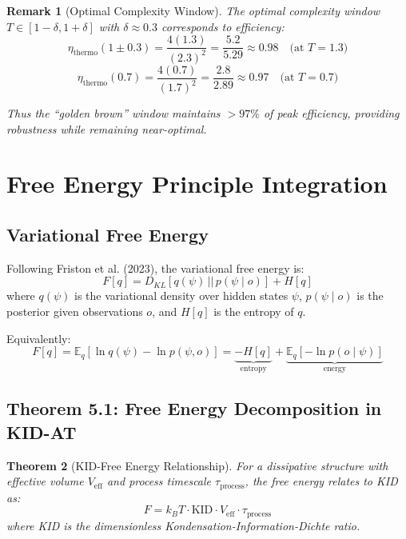 \documentclass[11pt,a4paper]{article}
\newtheorem{theorem}{Theorem}[section]
\newtheorem{remark}[theorem]{Remark}
\begin{document}
\begin{remark}[Optimal Complexity Window]
The optimal complexity window $T \in [1 - \delta, 1 + \delta]$ with $\delta \approx 0.3$ corresponds to efficiency:
\begin{equation}
\eta_{\text{thermo}}(1 \pm 0.3) = \frac{4(1.3)}{(2.3)^2} = \frac{5.2}{5.29} \approx 0.98 \quad \text{(at } T = 1.3\text{)}
\end{equation}
\begin{equation}
\eta_{\text{thermo}}(0.7) = \frac{4(0.7)}{(1.7)^2} = \frac{2.8}{2.89} \approx 0.97 \quad \text{(at } T = 0.7\text{)}
\end{equation}

Thus the ``golden brown'' window maintains $> 97\%$ of peak efficiency, providing robustness while remaining near-optimal.
\end{remark}


\section{Free Energy Principle Integration}

\subsection{Variational Free Energy}

Following Friston et al. (2023), the variational free energy is:
\begin{equation}
F[q] = D_{KL}[q(\psi) \,||\, p(\psi \mid o)] + H[q]
\end{equation}
where $q(\psi)$ is the variational density over hidden states $\psi$, $p(\psi \mid o)$ is the posterior given observations $o$, and $H[q]$ is the entropy of $q$.

Equivalently:
\begin{equation}
F[q] = \mathbb{E}_q[\ln q(\psi) - \ln p(\psi, o)] = \underbrace{-H[q]}_{\text{entropy}} + \underbrace{\mathbb{E}_q[-\ln p(o \mid \psi)]}_{\text{energy}}
\end{equation}

\subsection{Theorem 5.1: Free Energy Decomposition in KID-AT}

\begin{theorem}[KID-Free Energy Relationship]
For a dissipative structure with effective volume $V_{\text{eff}}$ and process timescale $\tau_{\text{process}}$, the free energy relates to KID as:
\begin{equation}
\boxed{F = k_B T \cdot \text{KID} \cdot V_{\text{eff}} \cdot \tau_{\text{process}}}
\end{equation}
where KID is the dimensionless Kondensation-Information-Dichte ratio.
\end{theorem}
\end{document}
